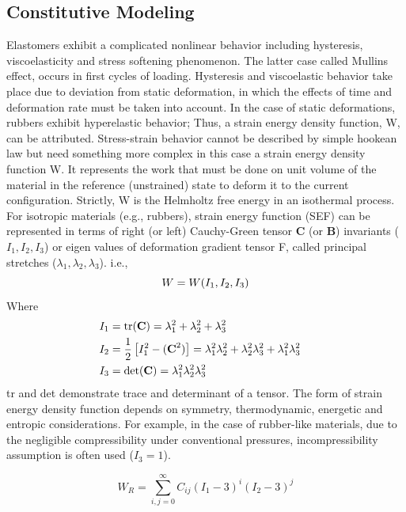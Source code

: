 \subsection{Constitutive Modeling}
Elastomers exhibit a complicated nonlinear behavior including
hysteresis, viscoelasticity and stress softening phenomenon. The
latter case called Mullins effect, occurs in first cycles of loading. Hysteresis and
viscoelastic behavior take place due to deviation from static
deformation, in which the effects of time and deformation rate
must be taken into account. In the case of static
deformations, rubbers exhibit hyperelastic behavior; Thus, a strain
energy density function, W, can be attributed.
Stress-strain behavior cannot be described by simple hookean law but need something more complex in this case a strain energy density function W. It represents the work that must be done on unit volume of the material in the reference (unstrained) state to deform it to the current configuration. Strictly, W is the Helmholtz free energy in an isothermal process.
For isotropic materials (e.g., rubbers), strain energy function
(SEF) can be represented in terms of right (or left) Cauchy-Green
tensor \textbf{C} (or \textbf{B}) invariants ($I_1, I_2, I_3$) or eigen values of deformation
gradient tensor F, called principal stretches ($\lambda_1, \lambda_2, \lambda_3$). i.e.,
\begin{equation}
W=W(I_1, I_2, I_3)\\
\end{equation}
Where
\begin{align*}
I_1&=\textrm{tr}(\textnormal{\textbf{C}})=\lambda_1^2+\lambda_2^2+\lambda_3^2&\\
I_2&=\frac{1}{2}\left[I^2_1-(\textnormal{\textbf{C}}^2)\right]=\lambda_1^2\lambda_2^2+\lambda_2^2\lambda_3^2+\lambda_1^2\lambda_3^2&\\
I_3&=\textrm{det}(\textnormal{\textbf{C}})=\lambda_1^2\lambda_2^2\lambda_3^2&
\end{align*}
tr and det demonstrate trace and determinant of a tensor. The form
of strain energy density function depends on symmetry, thermodynamic,
energetic and entropic considerations. For example, in the
case of rubber-like materials, due to the negligible compressibility
under conventional pressures, incompressibility assumption is
often used ($I_3 = 1$).

\begin{equation}
W_R=\sum_{i,j=0}^{\infty} C_{ij}(I_1-3)^i(I_2-3)^j
\end{equation}


